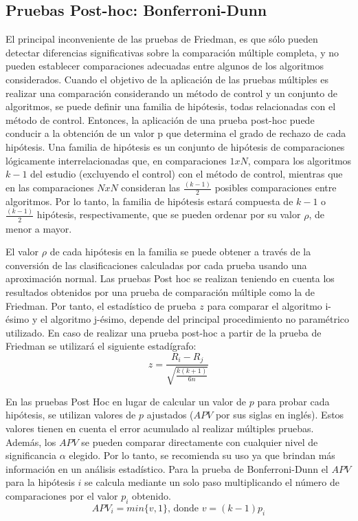 \subsection{Pruebas Post-hoc: Bonferroni-Dunn}
El principal inconveniente de las pruebas de Friedman, es que sólo pueden detectar diferencias significativas sobre la comparación múltiple completa, y no pueden establecer comparaciones adecuadas entre algunos de los algoritmos considerados. Cuando el objetivo de la aplicación de las pruebas múltiples es realizar una comparación considerando un método de control y un conjunto de algoritmos, se puede definir una familia de hipótesis, todas relacionadas con el método de control. Entonces, la aplicación de una prueba post-hoc puede conducir a la obtención de un valor p que determina el grado de rechazo de cada hipótesis. Una familia de hipótesis es un conjunto de hipótesis de comparaciones lógicamente interrelacionadas que, en comparaciones $1 x N$, compara los algoritmos $k - 1$ del estudio (excluyendo el control) con el método de control, mientras que en las comparaciones $NxN$ consideran las $\frac{(k-1)}{2}$ posibles comparaciones entre algoritmos. Por lo tanto, la familia de hipótesis estará compuesta de $k - 1$ o $\frac{(k-1)}{2}$ hipótesis, respectivamente, que se pueden ordenar por su valor $\rho$, de menor a mayor.

El valor $\rho$ de cada hipótesis en la familia se puede obtener a través de la conversión de las clasificaciones calculadas por cada prueba usando una aproximación normal. Las pruebas Post hoc se realizan teniendo en cuenta los resultados obtenidos por una prueba de comparación múltiple como la de Friedman. Por tanto, el estadístico de prueba $z$ para comparar el algoritmo i-ésimo y el algoritmo j-ésimo, depende del principal procedimiento no paramétrico utilizado. En caso de realizar una prueba post-hoc a partir de la prueba de Friedman se utilizará el siguiente estadígrafo:
\begin{equation}
z=\frac{R_i-R_j}{\sqrt{\frac{k(k+1)}{6n}}}
\end{equation}

En las pruebas Post Hoc en lugar de calcular un valor de $p$ para probar cada hipótesis, se utilizan valores de $p$ ajustados ($APV$ por sus siglas en inglés). Estos valores tienen en cuenta el error acumulado al realizar múltiples pruebas. Además, los $APV$ se pueden comparar directamente con cualquier nivel de significancia $\alpha$ elegido. Por lo tanto, se recomienda su uso ya que brindan más información en un análisis estadístico. Para la prueba de Bonferroni-Dunn el $APV$ para la hipótesis $i$ se calcula mediante un solo paso multiplicando el número de comparaciones por el valor $p_i$ obtenido.
\begin{equation}
APV_i=min \{v,1\} \text{, donde } v=(k-1)p_i
\end{equation}




